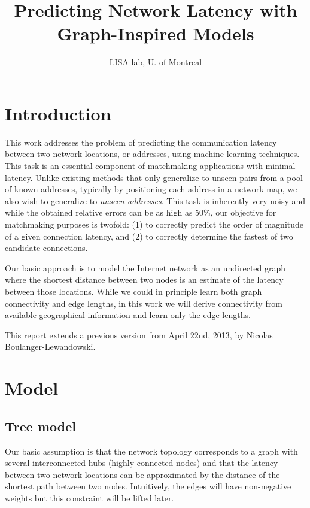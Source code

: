 \documentclass[10pt,a4paper,notitlepage,twocolumn]{article}
\author{LISA lab, U. of Montreal}
\title{Predicting Network Latency with Graph-Inspired Models}
\begin{document}
\maketitle

\section{Introduction}

This work addresses the problem of predicting the communication latency between two network locations, or addresses, using machine learning techniques.
This task is an essential component of matchmaking applications with minimal latency.
Unlike existing methods that only generalize to unseen pairs from a pool of known addresses, typically by positioning each address in a network map, we also wish to generalize to \emph{unseen addresses}.
%
This task is inherently very noisy and while the obtained relative errors can be as high as 50\%,
our objective for matchmaking purposes is twofold: (1) to correctly predict the order of magnitude of a given connection latency, and (2) to correctly determine the fastest of two candidate connections.

Our basic approach is to model the Internet network as an undirected graph where the shortest distance between two nodes is an estimate of the latency between those locations.
While we could in principle learn both graph connectivity and edge lengths, in this work we will derive connectivity from available geographical information and learn only the edge lengths.

This report extends a previous version from April 22nd, 2013, by Nicolas Boulanger-Lewandowski.

\section{Model}

\subsection{Tree model}

Our basic assumption is that the network topology corresponds to a graph with several interconnected hubs (highly connected nodes) and that the latency between two network locations can be approximated by the distance of the shortest path between two nodes.
Intuitively, the edges will have non-negative weights but this constraint will be lifted later.
\end{document}
